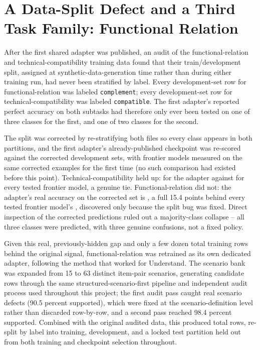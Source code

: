 \documentclass{article}
\newcommand{\code}[1]{\texttt{#1}}
\begin{document}
\section{A Data-Split Defect and a Third Task Family: Functional Relation}
\label{sec:functional-relation}
After the first shared adapter was published, an audit of the functional-relation and technical-compatibility training data found that their train/development split, assigned at synthetic-data-generation time rather than during either training run, had never been stratified by label. Every development-set row for functional-relation was labeled \code{complement}; every development-set row for technical-compatibility was labeled \code{compatible}. The first adapter's reported perfect accuracy on both subtasks had therefore only ever been tested on one of three classes for the first, and one of two classes for the second.

The split was corrected by re-stratifying both files so every class appears in both partitions, and the first adapter's already-published checkpoint was re-scored against the corrected development sets, with frontier models measured on the same corrected examples for the first time (no such comparison had existed before this point). Technical-compatibility held up: \AdapterOneCompatCorrectedAcc{} for the adapter against \CompatFrontierAcc{} for every tested frontier model, a genuine tie. Functional-relation did not: the adapter's real accuracy on the corrected set is \AdapterOneFunctionalCorrectedAcc{}, a full 15.4 points behind every tested frontier model's \FunctionalFrontierAcc{}, discovered only because the split bug was fixed. Direct inspection of the corrected predictions ruled out a majority-class collapse -- all three classes were predicted, with three genuine confusions, not a fixed policy.

Given this real, previously-hidden gap and only a few dozen total training rows behind the original signal, functional-relation was retrained as its own dedicated adapter, following the method that worked for Understand. The scenario bank was expanded from 15 to 63 distinct item-pair scenarios, generating candidate rows through the same structured-scenario-first pipeline and independent audit process used throughout this project; the first audit pass caught real scenario defects (90.5 percent supported), which were fixed at the scenario-definition level rather than discarded row-by-row, and a second pass reached 98.4 percent supported. Combined with the original audited data, this produced \FunctionalAdapterTotalRows{} total rows, re-split by label into training, development, and a locked test partition held out from both training and checkpoint selection throughout.
\end{document}
